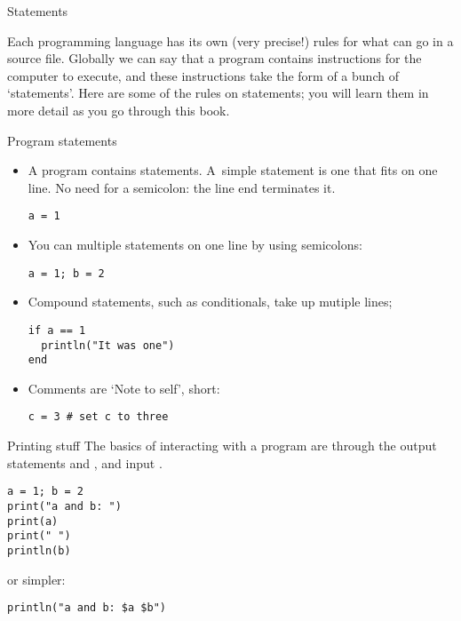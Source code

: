 
 {Statements}
\label{sec:statementsj}

Each programming language has its own (very precise!) rules for what
can go in a source file. Globally we can say that a program contains
instructions for the computer to execute, and these instructions take
the form of a bunch of `statements'. Here are some of the rules on
statements; you will learn them in more detail as you go through this
book.

\begin{block}{Program statements}
  \label{sl:jstatement}
  \begin{itemize}
  \item
    A program contains statements. A~simple statement
    is one that fits on one line. No need for a semicolon:
    the line end terminates it.
\begin{lstlisting}
a = 1
\end{lstlisting}
  \item You can multiple statements on one line by using semicolons:
\begin{lstlisting}
a = 1; b = 2
\end{lstlisting}
  \item Compound statements, such as conditionals, take up mutiple lines;
\begin{lstlisting}
if a == 1
  println("It was one")
end
\end{lstlisting}
\item Comments are `Note to self', short:
\begin{lstlisting}
c = 3 # set c to three
\end{lstlisting}
  \end{itemize}
\end{block}

\begin{block}{Printing stuff}
  The basics of interacting with a program are through the output
  statements  and ,
  and input .
  \begin{lstlisting}
a = 1; b = 2
print("a and b: ")
print(a)
print(" ")
println(b)
  \end{lstlisting}
or simpler:
  \begin{lstlisting}
println("a and b: $a $b")
  \end{lstlisting}
\end{block}


